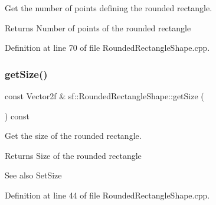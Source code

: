 Get the number of points defining the rounded rectangle. 

\begin{DoxyReturn}{Returns}
Number of points of the rounded rectangle \begin{DoxyVerb}\end{DoxyVerb}
 
\end{DoxyReturn}


Definition at line 70 of file Rounded\+Rectangle\+Shape.\+cpp.


\begin{DoxyCode}{0}

\end{DoxyCode}
\mbox{\label{classsf_1_1_rounded_rectangle_shape_a437e3e5a964b0716ae5aa55b77693993}} 
\subsubsection{\texorpdfstring{getSize()}{getSize()}}
{\footnotesize\ttfamily const Vector2f \& sf\+::\+Rounded\+Rectangle\+Shape\+::get\+Size (\begin{DoxyParamCaption}{ }\end{DoxyParamCaption}) const}



Get the size of the rounded rectangle. 

\begin{DoxyReturn}{Returns}
Size of the rounded rectangle
\end{DoxyReturn}
\begin{DoxySeeAlso}{See also}
Set\+Size \begin{DoxyVerb}\end{DoxyVerb}
 
\end{DoxySeeAlso}


Definition at line 44 of file Rounded\+Rectangle\+Shape.\+cpp.


\begin{DoxyCode}{0}

\end{DoxyCode}
\mbox{\label{classsf_1_1_rounded_rectangle_shape_a2c390618b1f93fcd406018c0ed2eaa2f}} 
